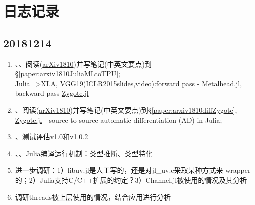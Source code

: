 \section{日志记录}
\label{sec:logs}

\subsection{20181214}

\redt{[TODO:\ZY 20181214]} 
\begin{enumerate}[T1.]
    \item \CaiWT、\HeLY、\YuCD 阅读\cite{fischer2018juliaMLtoTPU}(\href{https://arxiv.org/abs/1810.09868}{arXiv1810})并写笔记(中英文要点)到\S\ref{paper:arxiv1810JuliaMLtoTPU};
    \\Julia=>XLA, \href{http://arxiv.org/abs/1409.1556}{VGG19}(ICLR2015\href{https://www.iclr.cc/archive/www/lib/exe/fetch.php%3Fmedia=iclr2015:simonyan-iclr2015.pdf}{slides},\href{https://youtu.be/OQe-9P51Z0s}{video}):forward pass - \href{https://github.com/FluxML/Metalhead.jl}{Metalhead.jl}, backward pass \href{https://github.com/FluxML/Zygote.jl}{Zygote.jl}
    \item \DaiL、\HeJY 阅读\cite{innes2018diffZygote}(\href{https://arxiv.org/abs/1810.07951}{arXiv1810})并写笔记(中英文要点)到\S\ref{paper:arxiv1810diffZygote}, \href{https://github.com/FluxML/Zygote.jl}{Zygote.jl} - source-to-source automatic differentiation (AD) in Julia;
    \item \HeLY、\YuCD 测试评估v1.0和v1.0.2
    \item \CaiWT、\HeLY、\YuCD Julia编译运行机制：类型推断、类型特化
    \item \HeJY 进一步调研：1）libuv.jl是人工写的，还是对jl\_uv.c采取某种方式来 wrapper的；2）Julia支持C/C++扩展的约定？3）Channel.jl被使用的情况及其分析
    \item \ZhangLF 调研threads被上层使用的情况，结合应用进行分析
\end{enumerate}
